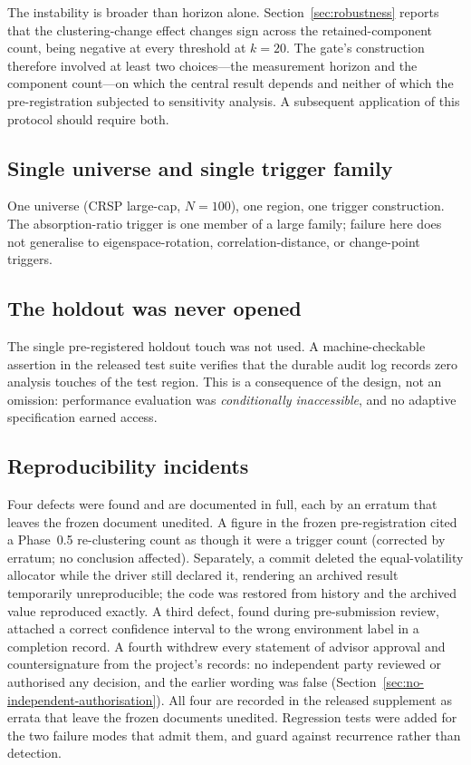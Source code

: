 \documentclass[12pt,letterpaper]{article}
\begin{document}
The instability is broader than horizon alone. Section~\ref{sec:robustness} reports that
the clustering-change effect changes sign across the retained-component count, being
negative at every threshold at $k = 20$. The gate's construction therefore involved at
least two choices---the measurement horizon and the component count---on which the
central result depends and neither of which the pre-registration subjected to
sensitivity analysis. A subsequent application of this protocol should require both.

\subsection{Single universe and single trigger family}

One universe (CRSP large-cap, $N = 100$), one region, one trigger construction. The
absorption-ratio trigger is one member of a large family; failure here does not
generalise to eigenspace-rotation, correlation-distance, or change-point triggers.

\subsection{The holdout was never opened}
\label{sec:holdout}

The single pre-registered holdout touch was not used. A machine-checkable assertion in
the released test suite verifies that the durable audit log records zero analysis
touches of the test region. This is a consequence of the design, not an omission:
performance evaluation was \emph{conditionally inaccessible}, and no adaptive
specification earned access.

\subsection{Reproducibility incidents}

Four defects were found and are documented in full, each by an erratum that leaves the frozen document unedited. A figure in the frozen
pre-registration cited a Phase~0.5 re-clustering count as though it were a trigger
count (corrected by erratum; no conclusion affected). Separately, a commit deleted the
equal-volatility allocator while the driver still declared it, rendering an archived
result temporarily unreproducible; the code was restored from history and the archived
value reproduced exactly. A third defect, found during pre-submission review, attached a correct confidence interval
to the wrong environment label in a completion record. A fourth withdrew every statement of
advisor approval and countersignature from the project's records: no independent party
reviewed or authorised any decision, and the earlier wording was false
(Section~\ref{sec:no-independent-authorisation}). All four are recorded in the released supplement as errata that leave the frozen documents
unedited. Regression tests were added for the two failure modes that admit them, and guard
against recurrence rather than detection.
\end{document}
